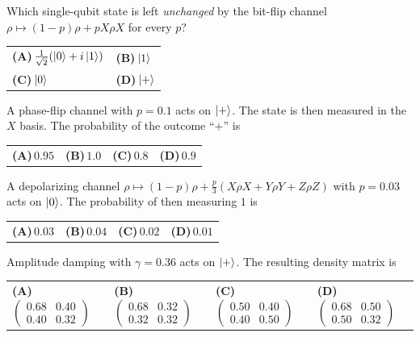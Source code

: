 \documentclass[11pt,a4paper]{article}
\newcommand{\optlabel}[1]{\textbf{(#1)}}
\newenvironment{qitem}[1]{\begin{list}{}{\setlength{\leftmargin}{3.3em}\setlength{\labelwidth}{3.1em}%
  \setlength{\labelsep}{0.2em}\setlength{\topsep}{3pt}\setlength{\parsep}{3pt}}\item[\textbf{Q.#1}\hfill]}{\end{list}}
\newcommand{\qsep}{\par\vspace{2pt}{\color{black!15}\hrule}\vspace{4pt}}
\begin{document}
\begin{qitem}{21}
Which single-qubit state is left \emph{unchanged} by the bit-flip channel $\rho \mapsto (1 - p)\rho + pX\rho X$ for every $p$?
\par\smallskip\noindent\begin{tabularx}{\linewidth}{@{}*{2}{L}@{}}
\optlabel{A}\,$\frac{1}{\sqrt2}(\ket0 + i\ket1)$ & \optlabel{B}\,$\ket1$ \\[3pt]
\optlabel{C}\,$\ket0$ & \optlabel{D}\,$\ket+$
\end{tabularx}
\end{qitem}
\qsep

\begin{qitem}{22}
A phase-flip channel with $p = 0.1$ acts on $\ket+$. The state is then measured in the $X$ basis. The probability of the
outcome ``$+$'' is
\par\smallskip\noindent\begin{tabularx}{\linewidth}{@{}*{4}{L}@{}}
\optlabel{A}\,$0.95$ & \optlabel{B}\,$1.0$ & \optlabel{C}\,$0.8$ & \optlabel{D}\,$0.9$
\end{tabularx}
\end{qitem}
\qsep

\begin{qitem}{23}
A depolarizing channel $\rho \mapsto (1 - p)\rho + \frac p3(X\rho X + Y\rho Y + Z\rho Z)$ with $p = 0.03$ acts on $\ket0$. The probability of
then measuring $1$ is
\par\smallskip\noindent\begin{tabularx}{\linewidth}{@{}*{4}{L}@{}}
\optlabel{A}\,$0.03$ & \optlabel{B}\,$0.04$ & \optlabel{C}\,$0.02$ & \optlabel{D}\,$0.01$
\end{tabularx}
\end{qitem}
\qsep

\begin{qitem}{24}
Amplitude damping with $\gamma = 0.36$ acts on $\ket+$. The resulting density matrix is
\par\smallskip\noindent\begin{tabularx}{\linewidth}{@{}*{4}{L}@{}}
\optlabel{A}\,$\begin{pmatrix}0.68 & 0.40\\ 0.40 & 0.32\end{pmatrix}$ & \optlabel{B}\,$\begin{pmatrix}0.68 & 0.32\\ 0.32 & 0.32\end{pmatrix}$ & \optlabel{C}\,$\begin{pmatrix}0.50 & 0.40\\ 0.40 & 0.50\end{pmatrix}$ & \optlabel{D}\,$\begin{pmatrix}0.68 & 0.50\\ 0.50 & 0.32\end{pmatrix}$
\end{tabularx}
\end{qitem}
\qsep
\end{document}

